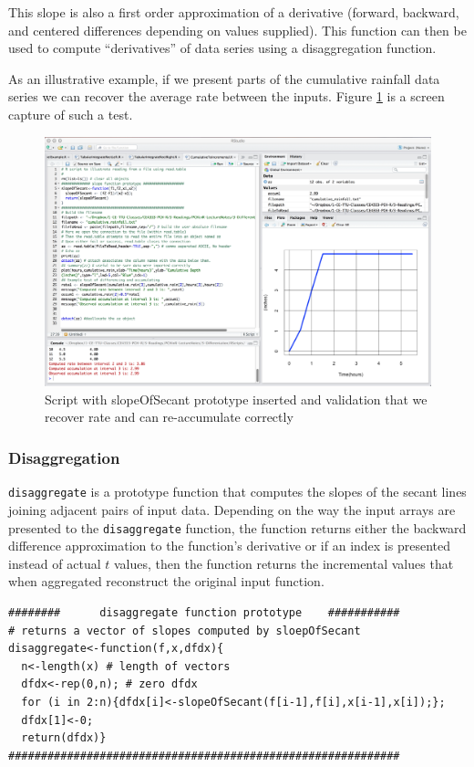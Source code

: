This slope is also a first order approximation of a derivative (forward, backward, and centered differences depending on values supplied).  This function can then be used to compute ``derivatives'' of data series using a disaggregation function.

As an illustrative example, if we present parts of the cumulative rainfall data series we can recover the average rate between the inputs.  Figure \ref{fig:addSecant} is a screen capture of such a test.

\begin{figure}[htbp] %
   \centering
   \includegraphics[width=6in]{./3-Differentation/addSecant.jpg} 
   \caption{Script with slopeOfSecant prototype inserted and validation that we recover rate and can re-accumulate correctly}
   \label{fig:addSecant}
\end{figure}

\subsubsection{Disaggregation}
\texttt{disaggregate} is a prototype function that computes the slopes of the secant lines joining adjacent pairs of input data.  Depending on the way the input arrays are presented to the \texttt{disaggregate} function, the function returns either the backward difference approximation to the function's derivative or if an index is presented instead of actual $t$ values, then the function returns the incremental values that when aggregated reconstruct the original input function.

\begin{lstlisting}[caption=R code demonstrating the prototype function \texttt{disaggregate()} , label=lst:Disaggregate]
########      disaggregate function prototype    ###########
# returns a vector of slopes computed by sloepOfSecant 
disaggregate<-function(f,x,dfdx){
  n<-length(x) # length of vectors
  dfdx<-rep(0,n); # zero dfdx
  for (i in 2:n){dfdx[i]<-slopeOfSecant(f[i-1],f[i],x[i-1],x[i]);};
  dfdx[1]<-0;
  return(dfdx)} 
############################################################
\end{lstlisting}

